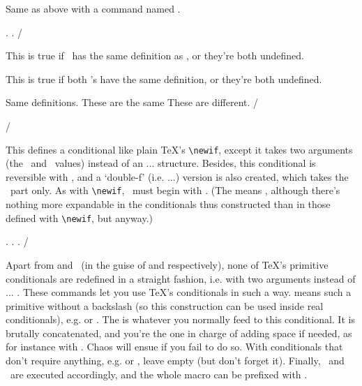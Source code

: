 \cslist{
  !\ifemptycs\csarg\true\false,
  !\iffemptycs\csarg\true
  }
Same as above with a command named \csarg.

\Example
\def\foo{}
\ifemptycommand\foo{Empty}{Not empty}.
\reverse{}.
\Example/



\cslist{
  !\ifxcs\csarg\comarg\true\false,
  !\iffxcs\csarg\comarg\true
  }
This is true if \csarg\ has the same definition as \comarg,
or they're both undefined.

\cslist{
  !\ifxcscs\csarg\csarg\true\false,
  !\iffxcscs\csarg\csarg\true
  }
This is true if both \csarg's have the same definition,
or they're both undefined.

\Example
{}\undefinedtoo
       {Same definitions.}
        {These are the same}
        {These are different}.
\Example/

\description/











\cslist{
  \newife\comarg
  }
This defines a conditional like plain \TeX's \verb/\newif/,
except it takes two arguments (the \true\ and \false\ values)
instead of an \com\else ... \com\fi structure. Besides,
this conditional is reversible with \com\reverse, and
a `double-f\kern1pt' (i.e. \com\iff...) version is also created,
which takes the \true\ part only. As with
\verb/\newif/, \comarg\ must begin with .
(The  means , although there's
nothing more expandable in the conditionals thus constructed
than in those defined with \verb/\newif/, but anyway.)

\Example
\newife\iffoo
{}.
\footrue
\reverse{}.
.
\Example/

Apart from \com\ifdefined and \com\ifcsname\ (in the guise
of \com\ifcommand and \com\ifcs respectively), none of \TeX's
primitive conditionals are redefined in a straight fashion,
i.e. with two arguments instead of \com\else ... \com\fi.
These commands let you use \TeX's conditionals in such a way.
 means such a primitive without a
backslash (so this construction can be used inside real
conditionals), e.g.  or .
The  is whatever you normally feed to this conditional.
It is brutally concatenated, and you're the one in charge
of adding space if needed, as for instance with .
Chaos will ensue if you fail to do so. With conditionals that don't
require anything, e.g.  or ,
leave  empty (but don't forget it).
Finally, \true\ and \false\ are executed accordingly, and the
whole macro can be prefixed with \com\reverse.

